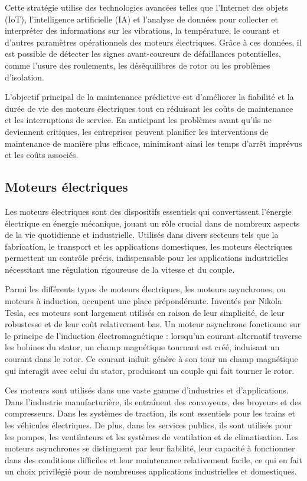 Cette stratégie utilise des technologies avancées telles que l'Internet des
objets (IoT), l'intelligence artificielle (IA) et l'analyse de données pour
collecter et interpréter des informations sur les vibrations, la température,
le courant et d'autres paramètres opérationnels des moteurs électriques. Grâce
à ces données, il est possible de détecter les signes avant-coureurs de
défaillances potentielles, comme l'usure des roulements, les déséquilibres de
rotor ou les problèmes d'isolation.

L'objectif principal de la maintenance prédictive est d'améliorer la fiabilité
et la durée de vie des moteurs électriques tout en réduisant les coûts de
maintenance et les interruptions de service. En anticipant les problèmes avant
qu'ils ne deviennent critiques, les entreprises peuvent planifier les
interventions de maintenance de manière plus efficace, minimisant ainsi les
temps d'arrêt imprévus et les coûts associés.

\subsection{Moteurs électriques}

Les moteurs électriques sont des dispositifs essentiels qui convertissent
l'énergie électrique en énergie mécanique, jouant un rôle crucial dans de
nombreux aspects de la vie quotidienne et industrielle. Utilisés dans divers
secteurs tels que la fabrication, le transport et les applications domestiques,
les moteurs électriques permettent un contrôle précis, indispensable pour les
applications industrielles nécessitant une régulation rigoureuse de la vitesse
et du couple.

Parmi les différents types de moteurs électriques, les moteurs asynchrones, ou
moteurs à induction, occupent une place prépondérante. Inventés par Nikola
Tesla, ces moteurs sont largement utilisés en raison de leur simplicité, de
leur robustesse et de leur coût relativement bas. Un moteur asynchrone
fonctionne sur le principe de l'induction électromagnétique : lorsqu'un courant
alternatif traverse les bobines du stator, un champ magnétique tournant est
créé, induisant un courant dans le rotor. Ce courant induit génère à son tour
un champ magnétique qui interagit avec celui du stator, produisant un couple
qui fait tourner le rotor.

Ces moteurs sont utilisés dans une vaste gamme d'industries et d'applications.
Dans l'industrie manufacturière, ils entraînent des convoyeurs, des broyeurs et
des compresseurs. Dans les systèmes de traction, ils sont essentiels pour les
trains et les véhicules électriques. De plus, dans les services publics, ils
sont utilisés pour les pompes, les ventilateurs et les systèmes de ventilation
et de climatisation. Les moteurs asynchrones se distinguent par leur fiabilité,
leur capacité à fonctionner dans des conditions difficiles et leur maintenance
relativement facile, ce qui en fait un choix privilégié pour de nombreuses
applications industrielles et domestiques.

